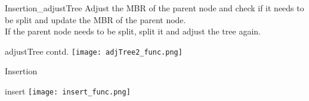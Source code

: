 \documentclass{beamer}
\begin{document}
\begin{frame}{Insertion_{adjustTree}}
Adjust the MBR of the parent node and check if it needs to be split and update the MBR of the parent node.\\
\bigskip
If the parent node needs to be split, split it and adjust the tree again.
    \begin{block}{adjustTree contd.}
       \texttt{[image: adjTree2\_func.png]}
    \end{block}
\end{frame}
\begin{frame}{Insertion}
    \begin{block}{insert}
       \texttt{[image: insert\_func.png]}
    \end{block}
\end{frame}
\end{document}
